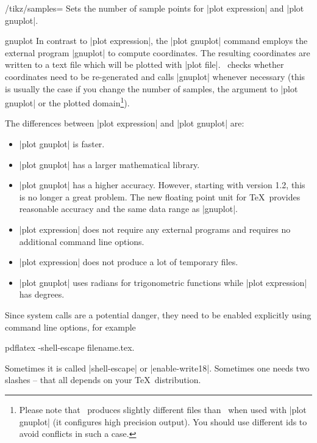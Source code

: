 \begin{key}{/tikz/samples=}
	 Sets the number of sample points for |plot expression| and |plot gnuplot|.
\end{key}


\begin{addplotoperation}[]{gnuplot}{}
In contrast to |plot expression|, the |plot gnuplot| command employs the external program |gnuplot| to compute coordinates. The resulting coordinates are written to a text file which will be plotted with |plot file|. \PGF\ checks whether coordinates need to be re-generated and calls |gnuplot| whenever necessary (this is usually the case if you change the number of samples, the argument to |plot gnuplot| or the plotted domain\footnote{Please note that \PGFPlots\ produces slightly different files than \Tikz\ when used with |plot gnuplot| (it configures high precision output). You should use different ids to avoid conflicts in such a case.}).

The differences between |plot expression| and |plot gnuplot| are:
\begin{itemize}
	\item |plot gnuplot| is faster.
	\item |plot gnuplot| has a larger mathematical library.
	\item |plot gnuplot| has a higher accuracy. However, starting with version 1.2, this is no longer a great problem. The new floating point unit for \TeX\ provides reasonable accuracy and the same data range as |gnuplot|.
	\item |plot expression| does not require any external programs and requires no additional command line options.
	\item |plot expression| does not produce a lot of temporary files.
	\item |plot gnuplot| uses radians for trigonometric functions while |plot expression| has degrees.
\end{itemize}

Since system calls are a potential danger, they need to be enabled explicitly using command line options, for example
\begin{codeexample}
pdflatex -shell-escape filename.tex.
\end{codeexample}
Sometimes it is called |shell-escape| or |enable-write18|. Sometimes one needs two slashes -- that all depends on your \TeX\ distribution.
\begin{codeexample}[]
\end{codeexample}


\end{addplotoperation}
